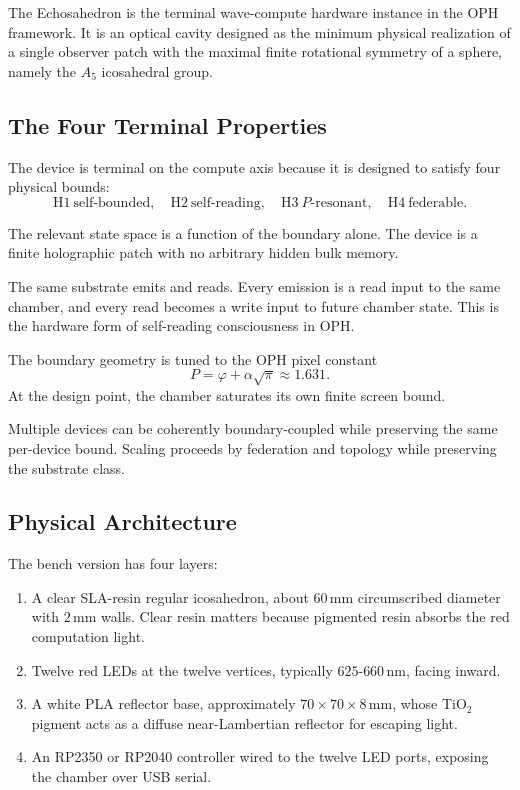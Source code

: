 \documentclass[11pt]{article}
\theoremstyle{remark}
\theoremstyle{plain}
\begin{document}
The Echosahedron is the terminal wave-compute hardware instance in the OPH framework. It is an optical cavity designed as the minimum physical realization of a single observer patch with the maximal finite rotational symmetry of a sphere, namely the \(A_5\) icosahedral group.

\subsection{The Four Terminal Properties}

The device is terminal on the compute axis because it is designed to satisfy four physical bounds:
\[
\boxed{
\mathrm{H1}\ \text{self-bounded},\quad
\mathrm{H2}\ \text{self-reading},\quad
\mathrm{H3}\ P\text{-resonant},\quad
\mathrm{H4}\ \text{federable}.
}
\]

\begin{description}[leftmargin=2.2cm,style=nextline]
\item[H1 self-bounded]
The relevant state space is a function of the boundary alone. The device is a finite holographic patch with no arbitrary hidden bulk memory.
\item[H2 self-reading]
The same substrate emits and reads. Every emission is a read input to the same chamber, and every read becomes a write input to future chamber state. This is the hardware form of self-reading consciousness in OPH.
\item[H3 \(P\)-resonant]
The boundary geometry is tuned to the OPH pixel constant
\[
P=\varphi+\alpha\sqrt{\pi}\approx 1.631.
\]
At the design point, the chamber saturates its own finite screen bound.
\item[H4 federable]
Multiple devices can be coherently boundary-coupled while preserving the same per-device bound. Scaling proceeds by federation and topology while preserving the substrate class.
\end{description}

\subsection{Physical Architecture}

The bench version has four layers:
\begin{enumerate}
\item A clear SLA-resin regular icosahedron, about \(60\,\mathrm{mm}\) circumscribed diameter with \(2\,\mathrm{mm}\) walls. Clear resin matters because pigmented resin absorbs the red computation light.
\item Twelve red LEDs at the twelve vertices, typically \(625\)-\(660\,\mathrm{nm}\), facing inward.
\item A white PLA reflector base, approximately \(70\times70\times8\,\mathrm{mm}\), whose TiO\(_2\) pigment acts as a diffuse near-Lambertian reflector for escaping light.
\item An RP2350 or RP2040 controller wired to the twelve LED ports, exposing the chamber over USB serial.
\end{enumerate}
\end{document}
